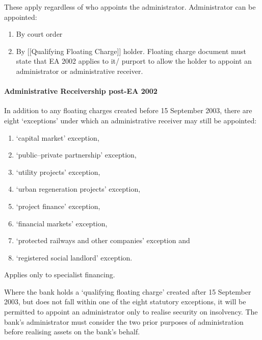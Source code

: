 \documentclass[
]{article}
\newenvironment{Shaded}{}{}
\newcommand{\NormalTok}[1]{#1}
\providecommand{\tightlist}{%
  \setlength{\itemsep}{0pt}\setlength{\parskip}{0pt}}
\begin{document}
These apply regardless of who appoints the administrator. Administrator
can be appointed:

\begin{enumerate}
\def\labelenumi{\arabic{enumi}.}
\tightlist
\item
  By court order
\item
  By {[}{[}Qualifying Floating Charge{]}{]} holder. Floating charge
  document must state that EA 2002 applies to it/ purport to allow the
  holder to appoint an administrator or administrative receiver.
\end{enumerate}

\hypertarget{administrative-receivership-post-ea-2002}{%
\paragraph{Administrative Receivership post-EA
2002}\label{administrative-receivership-post-ea-2002}}

In addition to any floating charges created before 15 September 2003,
there are eight `exceptions' under which an administrative receiver may
still be appointed:

\begin{enumerate}
\def\labelenumi{\arabic{enumi}.}
\tightlist
\item
  `capital market' exception,
\item
  `public--private partnership' exception,
\item
  `utility projects' exception,
\item
  `urban regeneration projects' exception,
\item
  `project finance' exception,
\item
  `financial markets' exception,
\item
  `protected railways and other companies' exception and
\item
  `registered social landlord' exception.
\end{enumerate}

Applies only to specialist financing.

\begin{Shaded}
\begin{Highlighting}[]
\NormalTok{Where the bank holds a ‘qualifying floating charge’ created after 15 September 2003, but does not fall within one of the eight statutory exceptions, it will be permitted to appoint an administrator only to realise security on insolvency. The bank’s administrator must consider the two prior purposes of administration before realising assets on the bank’s behalf.}
\end{Highlighting}
\end{Shaded}
\end{document}

